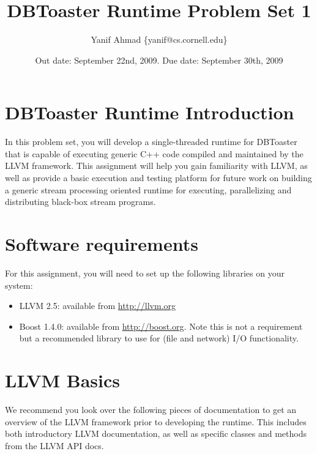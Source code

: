 \documentclass{article}
\begin{document}
\title{DBToaster Runtime Problem Set 1}
\author{Yanif Ahmad \{yanif@cs.cornell.edu\}}
\date{Out date: September 22nd, 2009. Due date: September 30th, 2009}
\maketitle

\section{DBToaster Runtime Introduction}
In this problem set, you will develop a single-threaded runtime for DBToaster that is capable of executing generic C++ code compiled and maintained by the LLVM framework. This assignment will help you gain familiarity with LLVM, as well as provide a basic execution and testing platform for future work on building a generic stream processing oriented runtime for executing, parallelizing and distributing black-box stream programs.

\section{Software requirements}
For this assignment, you will need to set up the following libraries on your system:

\begin{itemize}
\item LLVM 2.5: available from \url{http://llvm.org}
\item Boost 1.4.0: available from \url{http://boost.org}. Note this is not a requirement but a recommended library to use for (file and network) I/O functionality.
\end{itemize}

\section{LLVM Basics}

We recommend you look over the following pieces of documentation to get an overview of the LLVM framework prior to developing the runtime.
This includes both introductory LLVM documentation, as well as specific classes and methods from the LLVM API docs.
\end{document}
